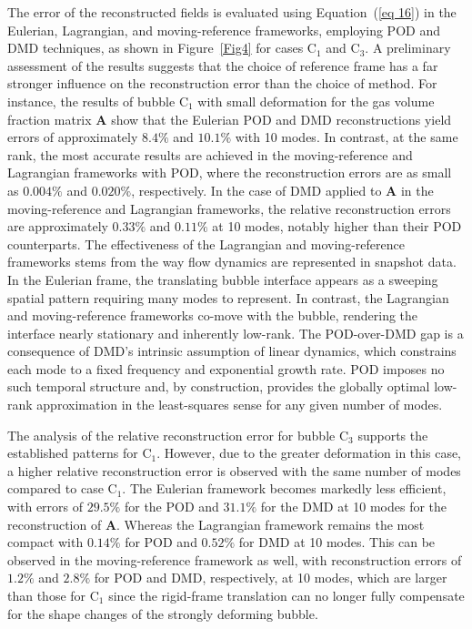 \documentclass[a4paper,fleqn]{cas-sc}
\begin{document}
	The error of the reconstructed fields is evaluated using Equation~(\ref{eq 16}) in the Eulerian, Lagrangian, and moving-reference frameworks, employing POD and DMD techniques, as shown in Figure~\ref{Fig4} for cases C$_1$ and C$_3$. A preliminary assessment of the results suggests that the choice of reference frame has a far stronger influence on the reconstruction error than the choice of method. For instance, the results of bubble C$_1$ with small deformation for the gas volume fraction matrix $\mathbf{A}$ show that the Eulerian POD and DMD reconstructions yield errors of approximately $8.4\%$ and $10.1\%$ with 10 modes. In contrast, at the same rank, the most accurate results are achieved in the moving-reference and Lagrangian frameworks with POD, where the reconstruction errors are as small as $0.004\%$ and $0.020\%$, respectively. In the case of DMD applied to $\mathbf{A}$ in the moving-reference and Lagrangian frameworks, the relative reconstruction errors are approximately $0.33\%$ and $0.11\%$ at 10 modes, notably higher than their POD counterparts. The effectiveness of the Lagrangian and moving-reference frameworks stems from the way flow dynamics are represented in snapshot data. In the Eulerian frame, the translating bubble interface appears as a sweeping spatial pattern requiring many modes to represent. In contrast, the Lagrangian and moving-reference frameworks co-move with the bubble, rendering the interface nearly stationary and inherently low-rank. The POD-over-DMD gap is a consequence of DMD's intrinsic assumption of linear dynamics, which constrains each mode to a fixed frequency and exponential growth rate. POD imposes no such temporal structure and, by construction, provides the globally optimal low-rank approximation in the least-squares sense for any given number of modes.
	
	The analysis of the relative reconstruction error for bubble C$_3$ supports the established patterns for C$_1$. However, due to the greater deformation in this case, a higher relative reconstruction error is observed with the same number of modes compared to case C$_1$. The Eulerian framework becomes markedly less efficient, with errors of $29.5\%$ for the POD and $31.1\%$ for the DMD at 10 modes for the reconstruction of $\mathbf{A}$. Whereas the Lagrangian framework remains the most compact with $0.14\%$ for POD and $0.52\%$ for DMD at 10 modes. This can be observed in the moving-reference framework as well, with reconstruction errors of $1.2\%$ and $2.8\%$ for POD and DMD, respectively, at 10 modes, which are larger than those for C$_1$ since the rigid-frame translation can no longer fully compensate for the shape changes of the strongly deforming bubble.
	
\end{document}
